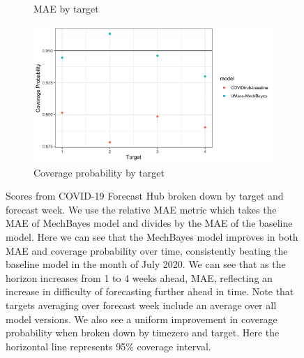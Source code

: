 \documentclass[11pt]{amsart}
\begin{document}
\begin{figure}
\begin{subfigure}{.5\textwidth}
    \caption{MAE by target}
\end{subfigure}%
\begin{subfigure}{.5\textwidth}
  \centering
    \includegraphics[scale=.115]{cp_results_by_target.png}
    \caption{Coverage probability by target}
\end{subfigure}%

\caption{Scores from COVID-19 Forecast Hub broken down by target and forecast week. We use the relative MAE metric which takes the MAE of MechBayes model and divides by the MAE of the baseline model. Here we can see that the MechBayes model improves in both MAE and coverage probability over time, consistently beating the baseline model in the month of July 2020. We can see that as the horizon increases from 1 to 4 weeks ahead, MAE, reflecting an increase in difficulty of forecasting further ahead in time. Note that targets averaging over forecast week include an average over all model versions. We also see a uniform improvement in coverage probability when broken down by timezero and target. Here the horizontal line represents 95\% coverage interval. }
\label{fig:covidhub_appendix}
\end{figure}
\end{document}
